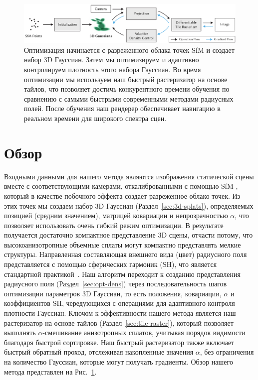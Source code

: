 \begin{figure}[!h]
    \includegraphics[width=\linewidth]{figures/overview/overview_01.pdf}
    \caption{
        Оптимизация начинается с разреженного облака точек SfM и создает набор 3D Гауссиан. Затем мы оптимизируем и адаптивно контролируем плотность этого набора Гауссиан. Во время оптимизации мы используем наш быстрый растеризатор на основе тайлов, что позволяет достичь конкурентного времени обучения по сравнению с самыми быстрыми современными методами радиусных полей. После обучения наш рендерер обеспечивает навигацию в реальном времени для широкого спектра сцен.
    }
    \label{fig:overview}
\end{figure}
\section{Обзор}
Входными данными для нашего метода являются изображения статической сцены вместе с соответствующими камерами, откалиброванными с помощью SfM \cite{schoenberger2016sfm}, который в качестве побочного эффекта создает разреженное облако точек.
Из этих точек мы создаем набор 3D Гауссиан %
(Раздел~\ref{sec:3d-splats}), 
определяемых позицией (средним значением), матрицей ковариации и непрозрачностью $\alpha$, что позволяет использовать очень гибкий режим оптимизации. В результате получается достаточно компактное представление 3D сцены, отчасти потому, что высокоанизотропные объемные сплаты могут компактно представлять мелкие структуры. Направленная составляющая внешнего вида (цвет) радиусного поля представляется с помощью сферических гармоник (SH), что является стандартной практикой~\cite{plenoxels,mueller2022instant}. Наш алгоритм переходит к созданию представления радиусного поля (Раздел~\ref{sec:opt-dens}) через последовательность шагов оптимизации параметров 3D Гауссиан, то есть положения, ковариации, $\alpha$ и коэффициентов SH, чередующихся с операциями для адаптивного контроля плотности Гауссиан.
Ключом к эффективности нашего метода является наш растеризатор на основе тайлов (Раздел~\ref{sec:tile-raster}), который позволяет выполнять $\alpha$-смешивание анизотропных сплатов, учитывая порядок видимости благодаря быстрой сортировке. Наш быстрый растеризатор также включает быстрый обратный проход, отслеживая накопленные значения $\alpha$, без ограничения на количество Гауссиан, которые могут получать градиенты.
Обзор нашего метода представлен на Рис.~\ref{fig:overview}.